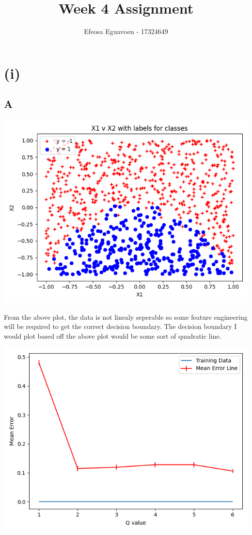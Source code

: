\documentclass[11pt]{article} %
\title{Week 4 Assignment}
\author{Efeosa Eguavoen - 17324649}
\begin{document}
\maketitle

\section{(i)}
\subsection{A}
\begin{center}
\includegraphics[scale=0.5]{x1vx2.png}
\end{center}
From the above plot, the data is not linealy seperable so some feature engineering will be required to get the correct decision boundary. The decision boundary I would plot based off the above plot would be some sort of quadratic line. 
\begin{center}
\includegraphics[scale=0.5]{qvalerr.png}
\end{center}
\end{document}

